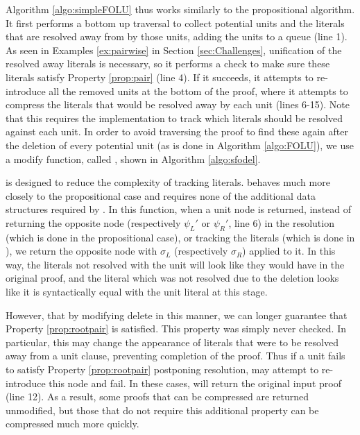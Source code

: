 Algorithm \ref{algo:simpleFOLU} thus works similarly to the propositional algorithm.  It first performs a bottom up traversal to collect potential units and the literals that are resolved away from by those units, adding the units to a queue (line 1). As seen in Examples \ref{ex:pairwise} in Section \ref{sec:Challenges}, unification of the resolved away literals is necessary, so it performs a check to make sure these literals satisfy Property \ref{prop:pair} (line 4). If it succeeds, it attempts to re-introduce all the removed units at the bottom of the proof, where it attempts to compress the literals that would be resolved away by each unit (lines 6-15). Note that this requires the implementation to track which literals should be resolved against each unit. In order to avoid traversing the proof to find these again after the deletion of every potential unit (as is done in Algorithm \ref{algo:FOLU}), we use a modify  function, called , shown in Algorithm \ref{algo:sfodel}.

 is designed to reduce the complexity of tracking literals.  behaves much more closely to the propositional case and requires none of the additional data structures required by . In this function, when a unit node is returned, instead of returning the opposite node (respectively $\psi_L'$ or $\psi_R'$, line 6) in the resolution (which is done in the propositional case), or tracking the literals (which is done in ), we return the opposite node with $\sigma_L$ (respectively $\sigma_R$) applied to it. In this way, the literals not resolved with the unit will look like they would have in the original proof, and the literal which was not resolved due to the deletion looks like it is syntactically equal with the unit literal at this stage.

However, that by modifying delete in this manner, we can longer guarantee that Property \ref{prop:rootpair} is satisfied. This property was simply never checked. In particular, this may change the appearance of literals that were to be resolved away from a unit clause, preventing completion of the proof. Thus if a unit fails to satisfy Property \ref{prop:rootpair} postponing resolution, {\SFOLowerUnits} may attempt to re-introduce this node and fail. In these cases, \SFOLowerUnits will return the original input proof (line 12). As a result, some proofs that can be compressed are returned unmodified, but those that do not require this additional property can be compressed much more quickly.




